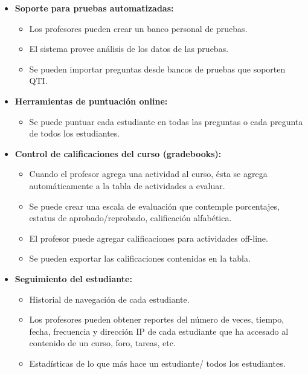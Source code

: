 	\begin{itemize}
		\item \textbf{Soporte para pruebas automatizadas:}
			\begin{itemize}
				\item Los profesores pueden crear un banco personal de pruebas.
				\item El sistema provee análisis de los datos de las pruebas.
				\item Se pueden importar preguntas desde bancos de pruebas que soporten QTI.
			\end{itemize}
	\end{itemize}
	\begin{itemize}
		\item \textbf{Herramientas de puntuación online:}
			\begin{itemize}
				\item Se puede puntuar cada estudiante en todas las preguntas o cada pregunta de todos los estudiantes.
			\end{itemize}
	\end{itemize}
	\begin{itemize}
		\item \textbf{Control de calificaciones del curso (gradebooks):}
			\begin{itemize}
				\item Cuando el profesor agrega una actividad al curso, ésta se agrega automáticamente a la tabla de actividades a evaluar.
				\item Se puede crear una escala de evaluación que contemple porcentajes, estatus de aprobado/reprobado, calificación alfabética.
				\item El profesor puede agregar calificaciones para actividades off-line.
				\item Se pueden exportar las calificaciones contenidas en la tabla.
			\end{itemize}
	\end{itemize}
	\begin{itemize}
		\item \textbf{Seguimiento del estudiante:}
			\begin{itemize}
				\item Historial de navegación de cada estudiante.
				\item Los profesores pueden obtener reportes del número de veces, tiempo, fecha, frecuencia y dirección IP de cada estudiante que ha accesado al contenido de un curso, foro, tareas, etc.
				\item Estadísticas de lo que más hace un estudiante/ todos los estudiantes.
			\end{itemize}
	\end{itemize}
